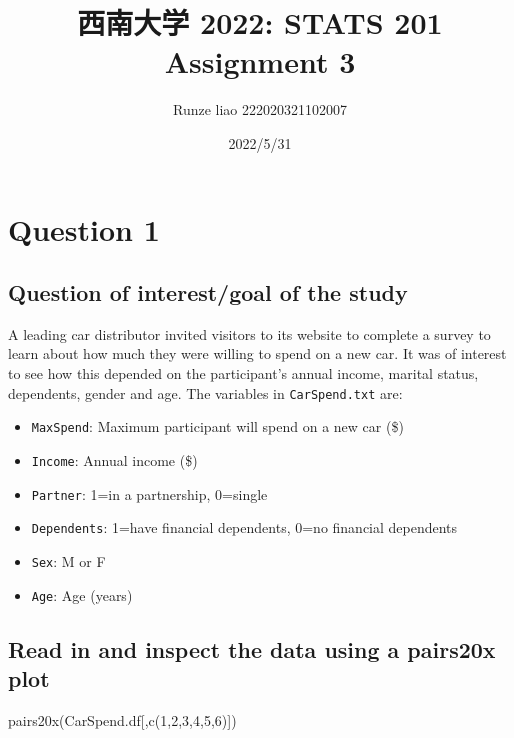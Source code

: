 \documentclass[
]{article}
\title{西南大学 2022: STATS 201 Assignment 3}
\author{Runze liao 222020321102007}
\date{2022/5/31}
\newenvironment{Shaded}{\begin{snugshade}}{\end{snugshade}}
\newcommand{\DecValTok}[1]{\textcolor[rgb]{0.00,0.00,0.81}{#1}}
\newcommand{\FunctionTok}[1]{\textcolor[rgb]{0.00,0.00,0.00}{#1}}
\newcommand{\NormalTok}[1]{#1}
\providecommand{\tightlist}{%
  \setlength{\itemsep}{0pt}\setlength{\parskip}{0pt}}
\begin{document}
\maketitle

\hypertarget{question-1}{%
\section{Question 1}\label{question-1}}

\hypertarget{question-of-interestgoal-of-the-study}{%
\subsection{Question of interest/goal of the
study}\label{question-of-interestgoal-of-the-study}}

A leading car distributor invited visitors to its website to complete a
survey to learn about how much they were willing to spend on a new car.
It was of interest to see how this depended on the participant's annual
income, marital status, dependents, gender and age. The variables in
\texttt{CarSpend.txt} are:

\begin{itemize}
\tightlist
\item
  \texttt{MaxSpend}: Maximum participant will spend on a new car (\$)
\item
  \texttt{Income}: Annual income (\$)
\item
  \texttt{Partner}: 1=in a partnership, 0=single
\item
  \texttt{Dependents}: 1=have financial dependents, 0=no financial
  dependents
\item
  \texttt{Sex}: M or F
\item
  \texttt{Age}: Age (years)
\end{itemize}

\hypertarget{read-in-and-inspect-the-data-using-a-pairs20x-plot}{%
\subsection{Read in and inspect the data using a pairs20x
plot}\label{read-in-and-inspect-the-data-using-a-pairs20x-plot}}

\begin{Shaded}
\begin{Highlighting}[]
\FunctionTok{pairs20x}\NormalTok{(CarSpend.df[,}\FunctionTok{c}\NormalTok{(}\DecValTok{1}\NormalTok{,}\DecValTok{2}\NormalTok{,}\DecValTok{3}\NormalTok{,}\DecValTok{4}\NormalTok{,}\DecValTok{5}\NormalTok{,}\DecValTok{6}\NormalTok{)])}
\end{Highlighting}
\end{Shaded}
\end{document}
